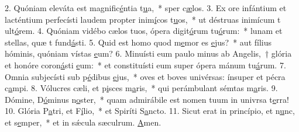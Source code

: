 2. Quóniam eleváta est magnific\uline{é}ntia t\uline{u}a,~* sper c\uline{æ}los.
3. Ex ore infántium et lacténtium perfecísti laudem propter inim\uline{í}cos t\uline{u}os,~* ut déstruas inimícum t ult\uline{ó}rem.
4. Quóniam vidébo cælos tuos, ópera digit\uline{ó}rum tu\uline{ó}rum:~* lunam et stellas, quæ t fund\uline{á}sti.
5. Quid est homo quod m\uline{e}mor es \uline{e}jus?~* aut fílius hóminis, quóniam vístas \uline{e}um?
6. Minuísti eum paulo minus ab Angelis,~† glória et honóre coron\uline{á}sti \uline{e}um:~* et constituísti eum super ópera mánum tu\uline{á}rum.
7. Omnia subjecísti sub p\uline{é}dibus \uline{e}jus,~* oves et boves univérsas: ínsuper et pécra c\uline{a}mpi.
8. Vólucres cæli, et p\uline{i}sces m\uline{a}ris,~* qui perámbulant sémtas m\uline{a}ris.
9. Dómine, D\uline{ó}minus n\uline{o}ster,~* quam admirábile est nomen tuum in univrsa t\uline{e}rra!
10. Glória P\uline{a}tri, et F\uline{í}lio,~* et Spiríti S\uline{a}ncto.
11. Sicut erat in princípio, et n\uline{u}nc, et s\uline{e}mper,~* et in sǽcula sæculrum. \uline{A}men.

